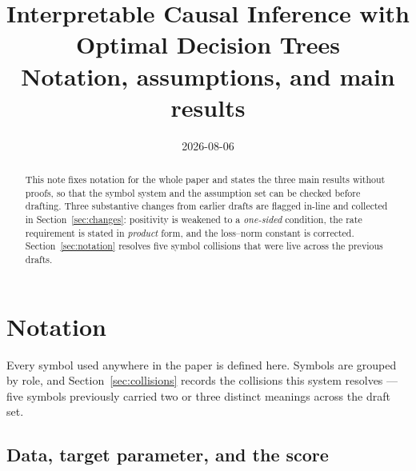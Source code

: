\documentclass[11pt]{article}
\title{Interpretable Causal Inference with Optimal Decision Trees\\
\large Notation, assumptions, and main results}
\author{}
\date{2026-08-06}
\theoremstyle{plain}
\theoremstyle{definition}
\theoremstyle{remark}
\begin{document}
\maketitle

\begin{abstract}
This note fixes notation for the whole paper and states the three main results
without proofs, so that the symbol system and the assumption set can be checked
before drafting. Three substantive changes from earlier drafts are flagged
in-line and collected in Section~\ref{sec:changes}: positivity is weakened to a
\emph{one-sided} condition, the rate requirement is stated in \emph{product}
form, and the loss--norm constant is corrected. Section~\ref{sec:notation}
resolves five symbol collisions that were live across the previous drafts.
\end{abstract}

\tableofcontents

\section{Notation}\label{sec:notation}

Every symbol used anywhere in the paper is defined here. Symbols are grouped by
role, and Section~\ref{sec:collisions} records the collisions this system
resolves --- five symbols previously carried two or three distinct meanings
across the draft set.

\subsection{Data, target parameter, and the score}
\end{document}
